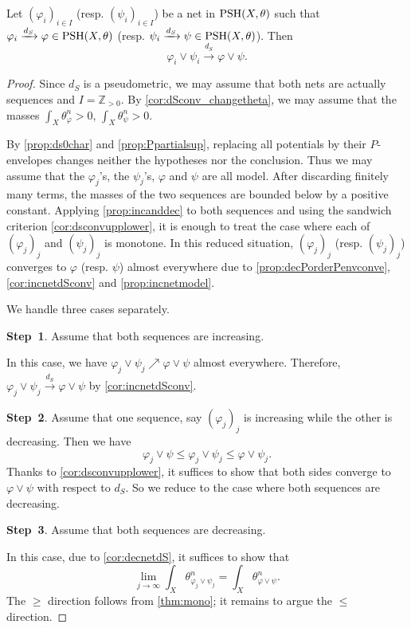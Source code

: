\begin{proposition}\label{prop:lor_dS_conv}
    Let $(\varphi_i)_{i\in I}$ (resp. $(\psi_i)_{i\in I}$) be a net in $\mathrm{PSH}(X,\theta)$ such that $\varphi_i \xrightarrow{d_S}\varphi\in \mathrm{PSH}(X,\theta)$ (resp. $\psi_i \xrightarrow{d_S}\psi\in \mathrm{PSH}(X,\theta)$).
    Then
    \[
    \varphi_i\lor\psi_i\xrightarrow{d_S}\varphi\lor \psi.
    \]
\end{proposition}
\begin{proof}
    Since $d_S$ is a pseudometric, we may assume that both nets are actually sequences and $I=\mathbb{Z}_{>0}$. By \cref{cor:dSconv_changetheta}, we may assume that the masses $\int_X \theta_{\varphi}^n>0$, $\int_X \theta_{\psi}^n>0$.

    By \cref{prop:ds0char} and \cref{prop:Ppartialsup}, replacing all potentials by their $P$-envelopes changes neither the hypotheses nor the conclusion. Thus we may assume that the $\varphi_j$'s, the $\psi_j$'s, $\varphi$ and $\psi$ are all model. After discarding finitely many terms, the masses of the two sequences are bounded below by a positive constant. Applying \cref{prop:incanddec} to both sequences and using the sandwich criterion \cref{cor:dsconvupplower}, it is enough to treat the case where each of $(\varphi_j)_j$ and $(\psi_j)_j$ is monotone. In this reduced situation, $(\varphi_j)_j$ (resp. $(\psi_j)_j$) converges to $\varphi$ (resp. $\psi$) almost everywhere due to \cref{prop:decPorderPenvconve}, \cref{cor:incnetdSconv} and \cref{prop:incnetmodel}.

    We handle three cases separately.

\textbf{Step~1}. Assume that both sequences are increasing.

In this case, we have $\varphi_j\lor \psi_j\nearrow \varphi\lor \psi$ almost everywhere. Therefore, $\varphi_j\lor \psi_j\xrightarrow{d_S} \varphi\lor \psi$ by \cref{cor:incnetdSconv}.

\textbf{Step~2}. Assume that one sequence, say $(\varphi_j)_j$ is increasing while the other is decreasing. Then we have
\[
\varphi_j \lor \psi \leq \varphi_j \lor \psi_j \leq \varphi \lor \psi_j.
\]
Thanks to \cref{cor:dsconvupplower}, it suffices to show that both sides converge to $\varphi\lor \psi$ with respect to $d_S$. So we reduce to the case where both sequences are decreasing.

\textbf{Step~3}. Assume that both sequences are decreasing.

In this case, due to \cref{cor:decnetdS}, it suffices to show that
\begin{equation}\label{eq:masslortemp1}
\lim_{j\to\infty} \int_X \theta_{\varphi_j\lor \psi_j}^n=\int_X \theta_{\varphi\lor \psi}^n.
\end{equation}
The $\geq$ direction follows from \cref{thm:mono}; it remains to argue the $\leq$ direction.


\end{proof}
